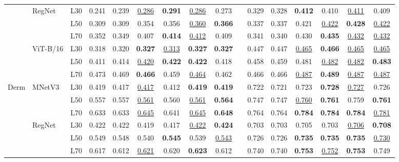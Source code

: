 \begin{table}[t]
\begin{tabular}{lll cccccc |c cccccc}
\cmidrule(lr){2-16}
 & \multirow{3}{*}{RegNet} & L30 & 0.241 & 0.239 & \underline{0.286} & \textbf{0.291} & \underline{0.286} & 0.273 & & 0.329 & 0.328 & \textbf{0.412} & 0.410 & \underline{0.411} & 0.409 \\
 &  & L50 & 0.309 & 0.309 & 0.354 & 0.356 & \underline{0.360} & \textbf{0.366} & & 0.337 & 0.337 & 0.421 & \underline{0.422} & \textbf{0.428} & \underline{0.422} \\
 &  & L70 & 0.352 & 0.349 & 0.407 & \textbf{0.414} & \underline{0.412} & 0.409 & & 0.341 & 0.340 & 0.430 & \textbf{0.435} & \underline{0.432} & \underline{0.432} \\
\cmidrule(lr){2-16}
 & \multirow{3}{*}{ViT-B/16} & L30 & 0.318 & 0.320 & \textbf{0.327} & \underline{0.313} & \textbf{0.327} & \textbf{0.327} & & 0.447 & 0.447 & \underline{0.465} & \textbf{0.466} & \underline{0.465} & \underline{0.465} \\
 &  & L50 & 0.411 & 0.414 & \underline{0.420} & \textbf{0.422} & \textbf{0.422} & 0.418 & & 0.458 & 0.459 & 0.481 & \underline{0.482} & \underline{0.482} & \textbf{0.483} \\
 &  & L70 & 0.473 & 0.469 & \textbf{0.466} & 0.459 & \underline{0.464} & 0.462 & & 0.466 & 0.466 & \underline{0.487} & \textbf{0.489} & \underline{0.487} & \underline{0.487} \\
\midrule
\multirow{9}{*}{Derm} & \multirow{3}{*}{MNetV3} & L30 & 0.419 & 0.417 & \underline{0.417} & 0.412 & \textbf{0.419} & \textbf{0.419} & & 0.722 & 0.721 & 0.723 & \textbf{0.728} & \underline{0.727} & 0.726 \\
 &  & L50 & 0.557 & 0.557 & \underline{0.561} & 0.560 & \underline{0.561} & \textbf{0.564} & & 0.747 & 0.747 & \underline{0.760} & \textbf{0.761} & 0.759 & \textbf{0.761} \\
 &  & L70 & 0.633 & 0.633 & \underline{0.645} & 0.641 & \underline{0.645} & \textbf{0.648} & & 0.764 & 0.764 & \textbf{0.784} & \textbf{0.784} & \textbf{0.784} & \underline{0.781} \\
\cmidrule(lr){2-16}
 & \multirow{3}{*}{RegNet} & L30 & 0.422 & 0.422 & 0.419 & 0.417 & \underline{0.422} & \textbf{0.424} & & 0.703 & 0.703 & 0.705 & 0.703 & \underline{0.706} & \textbf{0.708} \\
 &  & L50 & 0.549 & 0.548 & 0.540 & \textbf{0.545} & 0.539 & \underline{0.543} & & 0.726 & 0.726 & \textbf{0.735} & \textbf{0.735} & \textbf{0.735} & \underline{0.730} \\
 &  & L70 & 0.617 & 0.612 & \underline{0.621} & 0.620 & \textbf{0.623} & 0.612 & & 0.740 & 0.740 & \textbf{0.753} & \underline{0.752} & \textbf{0.753} & 0.749 \\

\end{tabular}
\end{table}
